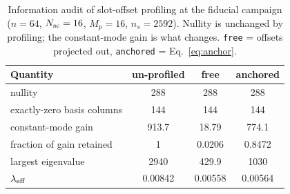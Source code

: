 \documentclass[twocolumn,10pt]{article}
\begin{document}
\begin{table}[t]
\centering
\caption{Information audit of slot-offset profiling at the fiducial
campaign ($n=64$, $N_{\rm sc}=16$, $M_p=16$, $n_s=2592$). Nullity is unchanged
by profiling; the constant-mode gain is what changes. \texttt{free} = offsets
projected out, \texttt{anchored} = Eq.~\ref{eq:anchor}.}
\label{tab:infaudit}
\footnotesize
\setlength{\tabcolsep}{1.6pt}
\renewcommand{\arraystretch}{1.05}
\begin{tabular}{lccc}
\toprule
Quantity & un-profiled & free & anchored \\
\midrule
nullity & 288 & 288 & 288 \\
exactly-zero basis columns & 144 & 144 & 144 \\
constant-mode gain & 913.7 & 18.79 & 774.1 \\
fraction of gain retained & 1 & 0.0206 & 0.8472 \\
largest eigenvalue & 2940 & 429.9 & 1030 \\
$\lambda_{\rm eff}$ & 0.00842 & 0.00558 & 0.00564 \\
\bottomrule
\end{tabular}
\end{table}
\end{document}
